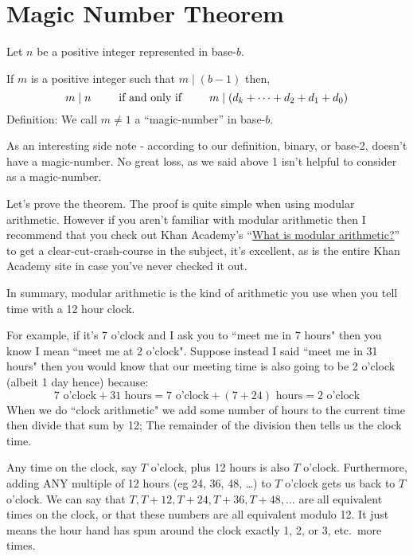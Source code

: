 \documentclass{article}
\newenvironment{jprIn}{\begin{adjustwidth}{2em}{}}{\end{adjustwidth}}
\begin{document}
\section*{Magic Number Theorem}
\begin{jprIn}
Let $n$ be a positive integer represented in base-$b$.

If $m$ is a positive integer such that $m\mid{}(b-1)$ then,
\[m\mid{}n \text{\hspace{2.5em}if and only if\hspace{2.5em}}m\mid{}(d_k+\dots+d_2+d_1+d_0)\]
Definition: We call $m\ne1$ a ``magic-number'' in base-$b$.
\end{jprIn}
\bigskip

As an interesting side note - according to our definition, binary,
or base-2, doesn't have a magic-number.
No great loss, as we said above 1 isn't helpful to consider as a magic-number. 

Let's prove the theorem. The proof is quite simple when using 
modular arithmetic. However if you aren't familiar with modular arithmetic
then I recommend that you check out Khan Academy's
``\href{https://www.khanacademy.org/computing/computer-science/cryptography/modarithmetic/a/what-is-modular-arithmetic}{What is modular arithmetic?}'' to
get a clear-cut-crash-course in the subject, it's excellent, as is the 
entire Khan Academy site in case you've never checked it out.

In summary, modular arithmetic is the kind of arithmetic you use when
you tell time with a 12 hour clock.

For example, if it's 7 o'clock and I ask you to ``meet me in 7 hours"
then you know I mean ``meet me at 2 o'clock".  Suppose instead I said ``meet me in 31 hours"
then you would know that our meeting time
is also going to be 2 o'clock (albeit 1 day hence) because:
\[7\text{ o'clock}+ 31\text{ hours}= 7\text{ o'clock}+ (7 + 24)\text{ hours}= 2\text{ o'clock}\]
When we do ``clock arithmetic" we add some
number of hours to the current time then divide that sum by 12;
The remainder of the division then
tells us the clock time.

Any time on the clock, say $T$ o'clock, plus 12 hours is also $T$ o'clock.  Furthermore,
adding ANY multiple of 12 hours (eg 24, 36, 48, \dots{}) to $T$ o'clock gets us back to $T$ o'clock.
We can say that $T, T{+}12, T{+}24, T{+}36, T{+}48, \dots{}$ are all equivalent times
on the clock, or that these numbers are all equivalent modulo 12. It just means the hour hand
has spun around the clock exactly 1, 2, or 3, etc.\ more times.
\end{document}

